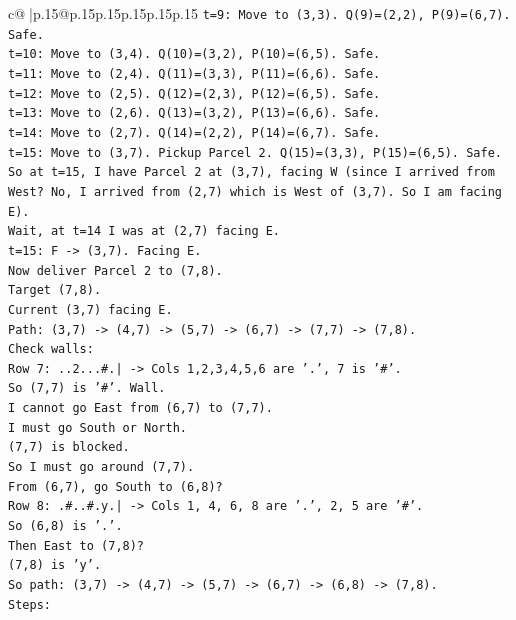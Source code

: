 \documentclass{article}
\begin{document}
{\begin{supertabular}{c@{$\;$}|p{.15\linewidth}@{}p{.15\linewidth}p{.15\linewidth}p{.15\linewidth}p{.15\linewidth}p{.15\linewidth}}
{{{\texttt{t=9: Move to (3,3). Q(9)=(2,2), P(9)=(6,7). Safe.} \\
\texttt{t=10: Move to (3,4). Q(10)=(3,2), P(10)=(6,5). Safe.} \\
\texttt{t=11: Move to (2,4). Q(11)=(3,3), P(11)=(6,6). Safe.} \\
\texttt{t=12: Move to (2,5). Q(12)=(2,3), P(12)=(6,5). Safe.} \\
\texttt{t=13: Move to (2,6). Q(13)=(3,2), P(13)=(6,6). Safe.} \\
\texttt{t=14: Move to (2,7). Q(14)=(2,2), P(14)=(6,7). Safe.} \\
\texttt{t=15: Move to (3,7). Pickup Parcel 2. Q(15)=(3,3), P(15)=(6,5). Safe.} \\
\texttt{So at t=15, I have Parcel 2 at (3,7), facing W (since I arrived from West? No, I arrived from (2,7) which is West of (3,7). So I am facing E).} \\
\texttt{Wait, at t=14 I was at (2,7) facing E.} \\
\texttt{t=15: F {-}> (3,7). Facing E.} \\
\texttt{Now deliver Parcel 2 to (7,8).} \\
\texttt{Target (7,8).} \\
\texttt{Current (3,7) facing E.} \\
\texttt{Path: (3,7) {-}> (4,7) {-}> (5,7) {-}> (6,7) {-}> (7,7) {-}> (7,8).} \\
\texttt{Check walls:} \\
\texttt{Row 7: ..2...\#.| {-}> Cols 1,2,3,4,5,6 are '.', 7 is '\#'.} \\
\texttt{So (7,7) is '\#'. Wall.} \\
\texttt{I cannot go East from (6,7) to (7,7).} \\
\texttt{I must go South or North.} \\
\texttt{(7,7) is blocked.} \\
\texttt{So I must go around (7,7).} \\
\texttt{From (6,7), go South to (6,8)?} \\
\texttt{Row 8: .\#..\#.y.| {-}> Cols 1, 4, 6, 8 are '.', 2, 5 are '\#'.} \\
\texttt{So (6,8) is '.'.} \\
\texttt{Then East to (7,8)?} \\
\texttt{(7,8) is 'y'.} \\
\texttt{So path: (3,7) {-}> (4,7) {-}> (5,7) {-}> (6,7) {-}> (6,8) {-}> (7,8).} \\
\texttt{Steps:} \\
}}}
\end{supertabular}}
\end{document}
